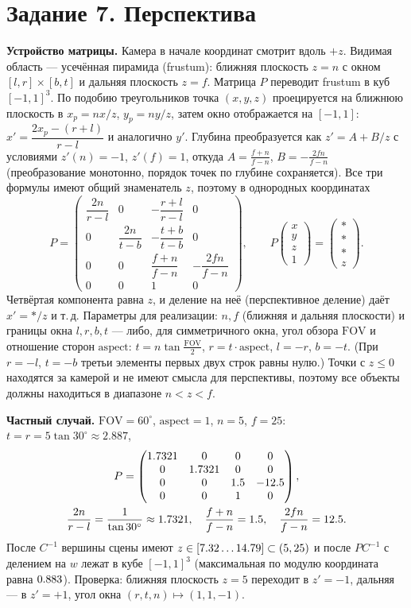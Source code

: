 \documentclass[a4paper, 12pt]{article}
\begin{document}
    \section{Задание 7. Перспектива}
    \textbf{Устройство матрицы.} Камера в начале координат смотрит вдоль $+z$. Видимая область --- усечённая пирамида (frustum): ближняя плоскость $z=n$ с окном $[l,r]\times[b,t]$ и дальняя плоскость $z=f$. Матрица $P$ переводит frustum в куб $[-1,1]^3$. По подобию треугольников точка $(x,y,z)$ проецируется на ближнюю плоскость в $x_p=nx/z$, $y_p=ny/z$, затем окно отображается на $[-1,1]$: $x'=\dfrac{2x_p-(r+l)}{r-l}$ и аналогично $y'$. Глубина преобразуется как $z'=A+B/z$ с условиями $z'(n)=-1$, $z'(f)=1$, откуда $A=\frac{f+n}{f-n}$, $B=-\frac{2fn}{f-n}$ (преобразование монотонно, порядок точек по глубине сохраняется). Все три формулы имеют общий знаменатель $z$, поэтому в однородных координатах
    $$P=\begin{pmatrix}\dfrac{2n}{r-l}&0&-\dfrac{r+l}{r-l}&0\\[1ex]0&\dfrac{2n}{t-b}&-\dfrac{t+b}{t-b}&0\\[1ex]0&0&\dfrac{f+n}{f-n}&-\dfrac{2fn}{f-n}\\[1ex]0&0&1&0\end{pmatrix},\qquad
    P\begin{pmatrix}x\\y\\z\\1\end{pmatrix}=\begin{pmatrix}\ast\\\ast\\\ast\\z\end{pmatrix}.$$
    Четвёртая компонента равна $z$, и деление на неё (перспективное деление) даёт $x'=\ast/z$ и т.\,д. Параметры для реализации: $n,f$ (ближняя и дальняя плоскости) и границы окна $l,r,b,t$ --- либо, для симметричного окна, угол обзора $\mathrm{FOV}$ и отношение сторон $\mathrm{aspect}$: $t=n\tan\frac{\mathrm{FOV}}2$, $r=t\cdot\mathrm{aspect}$, $l=-r$, $b=-t$. (При $r=-l$, $t=-b$ третьи элементы первых двух строк равны нулю.) Точки с $z\le0$ находятся за камерой и не имеют смысла для перспективы, поэтому все объекты должны находиться в диапазоне $n<z<f$.

    \textbf{Частный случай.} $\mathrm{FOV}=60^\circ$, $\mathrm{aspect}=1$, $n=5$, $f=25$: $t=r=5\tan30^\circ\approx2.887$,
    \begin{gather*}
    P=\begin{pmatrix}1.7321 & 0 & 0 & 0 \\ 0 & 1.7321 & 0 & 0 \\ 0 & 0 & 1.5 & -12.5 \\ 0 & 0 & 1 & 0\end{pmatrix},\\
    \frac{2n}{r-l}=\frac{1}{\tan30^\circ}\approx1.7321,\quad \frac{f+n}{f-n}=1.5,\quad \frac{2fn}{f-n}=12.5.
    \end{gather*}
    После $C^{-1}$ вершины сцены имеют $z\in[7.32\ldots 14.79]\subset(5,25)$ и после $PC^{-1}$ с делением на $w$ лежат в кубе $[-1,1]^3$ (максимальная по модулю координата равна $0.883$). Проверка: ближняя плоскость $z=5$ переходит в $z'=-1$, дальняя --- в $z'=+1$, угол окна $(r,t,n)\mapsto(1,1,-1)$.
\end{document}

